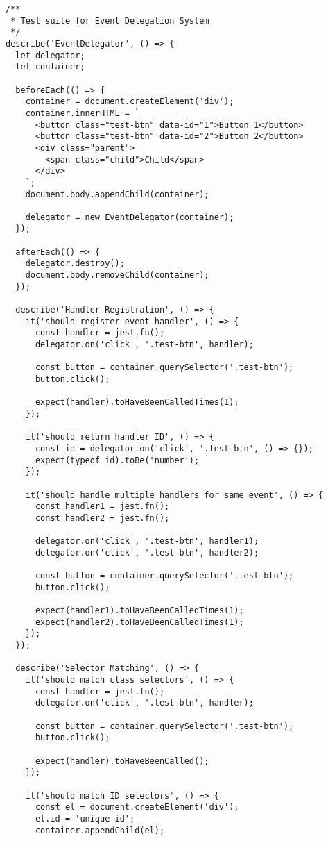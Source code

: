 \documentclass[11pt]{article}
\begin{document}
\begin{verbatim}
/**
 * Test suite for Event Delegation System
 */
describe('EventDelegator', () => {
  let delegator;
  let container;
  
  beforeEach(() => {
    container = document.createElement('div');
    container.innerHTML = `
      <button class="test-btn" data-id="1">Button 1</button>
      <button class="test-btn" data-id="2">Button 2</button>
      <div class="parent">
        <span class="child">Child</span>
      </div>
    `;
    document.body.appendChild(container);
    
    delegator = new EventDelegator(container);
  });
  
  afterEach(() => {
    delegator.destroy();
    document.body.removeChild(container);
  });
  
  describe('Handler Registration', () => {
    it('should register event handler', () => {
      const handler = jest.fn();
      delegator.on('click', '.test-btn', handler);
      
      const button = container.querySelector('.test-btn');
      button.click();
      
      expect(handler).toHaveBeenCalledTimes(1);
    });
    
    it('should return handler ID', () => {
      const id = delegator.on('click', '.test-btn', () => {});
      expect(typeof id).toBe('number');
    });
    
    it('should handle multiple handlers for same event', () => {
      const handler1 = jest.fn();
      const handler2 = jest.fn();
      
      delegator.on('click', '.test-btn', handler1);
      delegator.on('click', '.test-btn', handler2);
      
      const button = container.querySelector('.test-btn');
      button.click();
      
      expect(handler1).toHaveBeenCalledTimes(1);
      expect(handler2).toHaveBeenCalledTimes(1);
    });
  });
  
  describe('Selector Matching', () => {
    it('should match class selectors', () => {
      const handler = jest.fn();
      delegator.on('click', '.test-btn', handler);
      
      const button = container.querySelector('.test-btn');
      button.click();
      
      expect(handler).toHaveBeenCalled();
    });
    
    it('should match ID selectors', () => {
      const el = document.createElement('div');
      el.id = 'unique-id';
      container.appendChild(el);
      

\end{verbatim}
\end{document}
